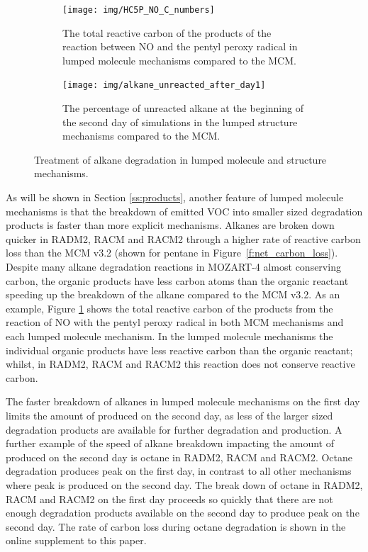 %
\begin{figure}
    \centering
    \begin{subfigure}[t]{0.4\textwidth}
        \texttt{[image: img/HC5P\_NO\_C\_numbers]}
        \caption{The total reactive carbon of the products of the reaction between NO and the pentyl peroxy radical in lumped molecule mechanisms compared to the MCM.}
        \label{f:HC5P_NO}
    \end{subfigure}
    \hspace{1cm}
    \begin{subfigure}[t]{0.4\textwidth}
        \texttt{[image: img/alkane\_unreacted\_after\_day1]}
        \caption{The percentage of unreacted alkane at the beginning of the second day of simulations in the lumped structure mechanisms compared to the MCM.}
        \label{f:Unreacted_PAR}
    \end{subfigure}
    \vspace{3mm}
    \caption{Treatment of alkane degradation in lumped molecule and structure mechanisms.}
    \vspace{-4mm}
    \label{f:alkanes}
\end{figure}
%
As will be shown in Section \ref{ss:products}, another feature of lumped molecule mechanisms is that the breakdown of emitted VOC into smaller sized degradation products is faster than more explicit mechanisms.
Alkanes are broken down quicker in RADM2, RACM and RACM2 through a higher rate of reactive carbon loss than the MCM v3.2 (shown for pentane in \mbox{Figure \ref{f:net_carbon_loss}}).
Despite many alkane degradation reactions in MOZART-4 almost conserving carbon, the organic products have less carbon atoms than the organic reactant speeding up the breakdown of the alkane compared to the MCM v3.2.
As an example, Figure \ref{f:HC5P_NO} shows the total reactive carbon of the products from the reaction of NO with the pentyl peroxy radical in both MCM mechanisms and each lumped molecule mechanism.
In the lumped molecule mechanisms the individual organic products have less reactive carbon than the organic reactant; whilst, in RADM2, RACM and RACM2 this reaction does not conserve reactive carbon.  

The faster breakdown of alkanes in lumped molecule mechanisms on the first day limits the amount of  produced on the second day, as less of the larger sized degradation products are available for further degradation and  production.  
A further example of the speed of alkane breakdown impacting the amount of  produced on the second day is octane in RADM2, RACM and RACM2.
Octane degradation produces peak  on the first day, in contrast to all other mechanisms where peak  is produced on the second day.
The break down of octane in RADM2, RACM and RACM2 on the first day proceeds so quickly that there are not enough degradation products available on the second day to produce peak  on the second day.
The rate of carbon loss during octane degradation is shown in the online supplement to this paper.

